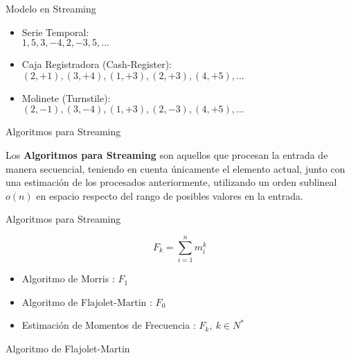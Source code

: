 \documentclass[12pt]{beamer}
\begin{document}
    \begin{frame}[fragile]{Modelo en Streaming}

    \begin{itemize}
      \item Serie Temporal:\\
        $1, 5, 3, -4, 2, -3, 5,...$
      \item Caja Registradora (Cash-Register): \\
        $(2, +1), (3, +4), (1, +3), (2, +3), (4, +5),...$
      \item Molinete (Turnstile): \\
        $(2, -1), (3, -4), (1, +3), (2, -3), (4, +5),...$
    \end{itemize}

  \end{frame}

    \begin{frame}[fragile]{Algoritmos para Streaming}

      Los \textbf{Algoritmos para Streaming} son aquellos que procesan la entrada de manera secuencial, teniendo en cuenta únicamente el elemento actual, junto con una estimación de los procesados anteriormente, utilizando un orden sublineal $o(n)$ en espacio respecto del rango de posibles valores en la entrada.

    \end{frame}

    \begin{frame}[fragile]{Algoritmos para Streaming}

      \begin{equation}
        F_k = \sum_{i=1}^n m_i^k
      \end{equation}

      \begin{itemize}
        \item Algoritmo de Morris \cite{morris1978counting}: $F_1$
        \item Algoritmo de Flajolet-Martin \cite{flajolet1985probabilistic}: $F_0$
        \item Estimación de Momentos de Frecuencia \cite{alon1996space}: $F_k, \ k \in N^*$
      \end{itemize}

    \end{frame}

    \begin{frame}[fragile]{Algoritmo de Flajolet-Martin}

      \begin{figure}
        \caption{}
      \end{figure}

    \end{frame}
\end{document}
